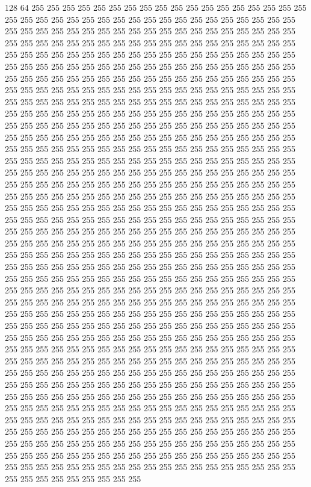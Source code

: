 128 64 255 255 255 255 255 255 255 255 255 255 255 255 255 255 255 255 255 255 255 255 255 255 255 255 255 255 255 255 255 255 255 255 255 255 255 255 255 255 255 255 255 255 255 255 255 255 255 255 255 255 255 255 255 255 255 255 255 255 255 255 255 255 255 255 255 255 255 255 255 255 255 255 255 255 255 255 255 255 255 255 255 255 255 255 255 255 255 255 255 255 255 255 255 255 255 255 255 255 255 255 255 255 255 255 255 255 255 255 255 255 255 255 255 255 255 255 255 255 255 255 255 255 255 255 255 255 255 255 
255 255 255 255 255 255 255 255 255 255 255 255 255 255 255 255 255 255 255 255 255 255 255 255 255 255 255 255 255 255 255 255 255 255 255 255 255 255 255 255 255 255 255 255 255 255 255 255 255 255 255 255 255 255 255 255 255 255 255 255 255 255 255 255 255 255 255 255 255 255 255 255 255 255 255 255 255 255 255 255 255 255 255 255 255 255 255 255 255 255 255 255 255 255 255 255 255 255 255 255 255 255 255 255 255 255 255 255 255 255 255 255 255 255 255 255 255 255 255 255 255 255 255 255 255 255 255 255 
255 255 255 255 255 255 255 255 255 255 255 255 255 255 255 255 255 255 255 255 255 255 255 255 255 255 255 255 255 255 255 255 255 255 255 255 255 255 255 255 255 255 255 255 255 255 255 255 255 255 255 255 255 255 255 255 255 255 255 255 255 255 255 255 255 255 255 255 255 255 255 255 255 255 255 255 255 255 255 255 255 255 255 255 255 255 255 255 255 255 255 255 255 255 255 255 255 255 255 255 255 255 255 255 255 255 255 255 255 255 255 255 255 255 255 255 255 255 255 255 255 255 255 255 255 255 255 255 
255 255 255 255 255 255 255 255 255 255 255 255 255 255 255 255 255 255 255 255 255 255 255 255 255 255 255 255 255 255 255 255 255 255 255 255 255 255 255 255 255 255 255 255 255 255 255 255 255 255 255 255 255 255 255 255 255 255 255 255 255 255 255 255 255 255 255 255 255 255 255 255 255 255 255 255 255 255 255 255 255 255 255 255 255 255 255 255 255 255 255 255 255 255 255 255 255 255 255 255 255 255 255 255 255 255 255 255 255 255 255 255 255 255 255 255 255 255 255 255 255 255 255 255 255 255 255 255 
255 255 255 255 255 255 255 255 255 255 255 255 255 255 255 255 255 255 255 255 255 255 255 255 255 255 255 255 255 255 255 255 255 255 255 255 255 255 255 255 255 255 255 255 255 255 255 255 255 255 255 255 255 255 255 255 255 255 255 255 255 255 255 255 255 255 255 255 255 255 255 255 255 255 255 255 255 255 255 255 255 255 255 255 255 255 255 255 255 255 255 255 255 255 255 255 255 255 255 255 255 255 255 255 255 255 255 255 255 255 255 255 255 255 255 255 255 255 255 255 255 255 255 255 255 255 255 255 
255 255 255 255 255 255 255 255 255 255 255 255 255 255 255 255 255 255 255 255 255 255 255 255 255 255 255 255 255 255 255 255 255 255 255 255 255 255 255 255 255 255 255 255 255 255 255 255 255 255 255 255 255 255 255 255 255 255 255 255 255 255 255 255 255 255 255 255 255 255 255 255 255 255 255 255 255 255 255 255 255 255 255 255 255 255 255 255 255 255 255 255 255 255 255 255 255 255 255 255 255 255 255 255 255 255 255 255 255 255 255 255 255 255 255 255 255 255 255 255 255 255 255 255 255 255 255 255 
